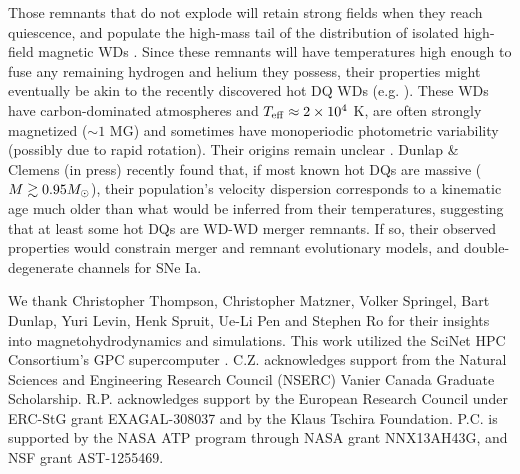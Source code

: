 Those remnants that do not explode will retain strong fields when they reach quiescence, and populate the high-mass tail of the distribution of isolated high-field magnetic WDs \citep{garc+12,kule+13,wicktf14,brig+15}.  Since these remnants will have temperatures high enough to fuse any remaining hydrogen and helium they possess, their properties might eventually be akin to the recently discovered hot DQ WDs (e.g. \citealt{dufo+13}).  These WDs have carbon-dominated atmospheres and $T_\mathrm{eff} \approx 2\times10^4$ K, are often strongly magnetized ($\sim1$ MG) and sometimes have monoperiodic photometric variability (possibly due to rapid rotation).  Their origins remain unclear \citep{alth+09, lawr+13, will+13}.  Dunlap \& Clemens (in press) recently found that, if most known hot DQs are massive ($M \gtrsim 0.95\Msun$), their population's velocity dispersion corresponds to a kinematic age much older than what would be inferred from their temperatures, suggesting that at least some hot DQs are WD-WD merger remnants.  If so, their observed properties would constrain merger and remnant evolutionary models, and double-degenerate channels for SNe Ia.

\vspace{5mm}

We thank Christopher Thompson, Christopher Matzner, Volker Springel, Bart Dunlap, Yuri Levin, Henk Spruit, Ue-Li Pen and Stephen Ro for their insights into magnetohydrodynamics and simulations.  This work utilized the SciNet HPC Consortium's GPC supercomputer \citep{loke+10}.  C.Z. acknowledges support from the Natural Sciences and Engineering Research Council (NSERC) Vanier Canada Graduate Scholarship.  R.P. acknowledges support by the European Research Council under ERC-StG grant EXAGAL-308037 and by the Klaus Tschira Foundation.  P.C. is supported by the NASA ATP program through NASA grant NNX13AH43G, and NSF grant AST-1255469.  
